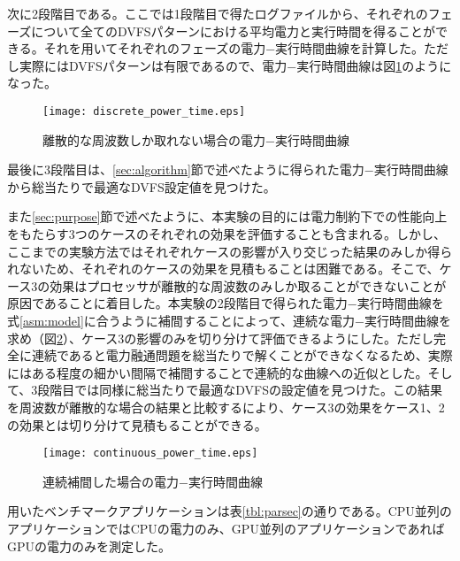 次に2段階目である。ここでは1段階目で得たログファイルから、それぞれのフェーズについて全てのDVFSパターンにおける平均電力と実行時間を得ることができる。それを用いてそれぞれのフェーズの電力−実行時間曲線を計算した。ただし実際にはDVFSパターンは有限であるので、電力−実行時間曲線は図\ref{fig:discrete_power_time}のようになった。

\begin{figure}[t]
 \begin{center}
  \texttt{[image: discrete\_power\_time.eps]}
 \end{center}
 \caption{離散的な周波数しか取れない場合の電力−実行時間曲線}
 \label{fig:discrete_power_time}
\end{figure}

最後に3段階目は、\ref{sec:algorithm}節で述べたように得られた電力−実行時間曲線から総当たりで最適なDVFS設定値を見つけた。

また\ref{sec:purpose}節で述べたように、本実験の目的には電力制約下での性能向上をもたらす3つのケースのそれぞれの効果を評価することも含まれる。しかし、ここまでの実験方法ではそれぞれケースの影響が入り交じった結果のみしか得られないため、それぞれのケースの効果を見積もることは困難である。そこで、ケース3の効果はプロセッサが離散的な周波数のみしか取ることができないことが原因であることに着目した。本実験の2段階目で得られた電力−実行時間曲線を式\ref{asm:model}に合うように補間することによって、連続な電力−実行時間曲線を求め（図\ref{fig:continuous_power_time}）、ケース3の影響のみを切り分けて評価できるようにした。ただし完全に連続であると電力融通問題を総当たりで解くことができなくなるため、実際にはある程度の細かい間隔で補間することで連続的な曲線への近似とした。そして、3段階目では同様に総当たりで最適なDVFSの設定値を見つけた。この結果を周波数が離散的な場合の結果と比較するにより、ケース3の効果をケース1、2の効果とは切り分けて見積もることができる。

\begin{figure}[t]
 \begin{center}
  \texttt{[image: continuous\_power\_time.eps]}
 \end{center}
 \caption{連続補間した場合の電力−実行時間曲線}
 \label{fig:continuous_power_time}
\end{figure}

用いたベンチマークアプリケーションは表\ref{tbl:parsec}の通りである。CPU並列のアプリケーションではCPUの電力のみ、GPU並列のアプリケーションであればGPUの電力のみを測定した。

